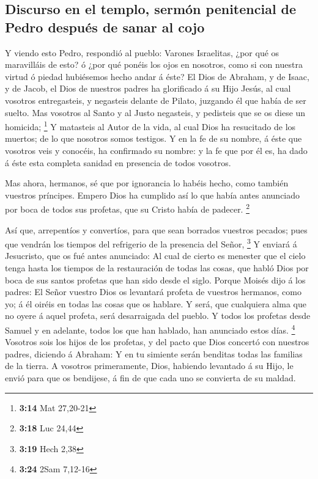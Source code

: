 \hypertarget{discurso-en-el-templo-sermuxf3n-penitencial-de-pedro-despuuxe9s-de-sanar-al-cojo}{%
\subsection{Discurso en el templo, sermón penitencial de Pedro después
de sanar al
cojo}\label{discurso-en-el-templo-sermuxf3n-penitencial-de-pedro-despuuxe9s-de-sanar-al-cojo}}

 Y viendo esto Pedro, respondió al pueblo: Varones
Israelitas, ¿por qué os maravilláis de esto? ó ¿por qué ponéis los ojos
en nosotros, como si con nuestra virtud ó piedad hubiésemos hecho andar
á éste?  El Dios de Abraham, y de Isaac, y de Jacob, el
Dios de nuestros padres ha glorificado á su Hijo Jesús, al cual vosotros
entregasteis, y negasteis delante de Pilato, juzgando él que había de
ser suelto.  Mas vosotros al Santo y al Justo negasteis, y
pedisteis que se os diese un homicida; \footnote{\textbf{3:14} Mat
  27,20-21}  Y matasteis al Autor de la vida, al cual Dios
ha resucitado de los muertos; de lo que nosotros somos testigos.
 Y en la fe de su nombre, á éste que vosotros veis y
conocéis, ha confirmado su nombre: y la fe que por él es, ha dado á éste
esta completa sanidad en presencia de todos vosotros.

 Mas ahora, hermanos, sé que por ignorancia lo habéis
hecho, como también vuestros príncipes.  Empero Dios ha
cumplido así lo que había antes anunciado por boca de todos sus
profetas, que su Cristo había de padecer. \footnote{\textbf{3:18} Luc
  24,44}

 Así que, arrepentíos y convertíos, para que sean borrados
vuestros pecados; pues que vendrán los tiempos del refrigerio de la
presencia del Señor, \footnote{\textbf{3:19} Hech 2,38}  Y
enviará á Jesucristo, que os fué antes anunciado:  Al cual
de cierto es menester que el cielo tenga hasta los tiempos de la
restauración de todas las cosas, que habló Dios por boca de sus santos
profetas que han sido desde el siglo.  Porque Moisés dijo á
los padres: El Señor vuestro Dios os levantará profeta de vuestros
hermanos, como yo; á él oiréis en todas las cosas que os hablare.
 Y será, que cualquiera alma que no oyere á aquel profeta,
será desarraigada del pueblo.  Y todos los profetas desde
Samuel y en adelante, todos los que han hablado, han anunciado estos
días. \footnote{\textbf{3:24} 2Sam 7,12-16}  Vosotros sois
los hijos de los profetas, y del pacto que Dios concertó con nuestros
padres, diciendo á Abraham: Y en tu simiente serán benditas todas las
familias de la tierra.  A vosotros primeramente, Dios,
habiendo levantado á su Hijo, le envió para que os bendijese, á fin de
que cada uno se convierta de su maldad.

